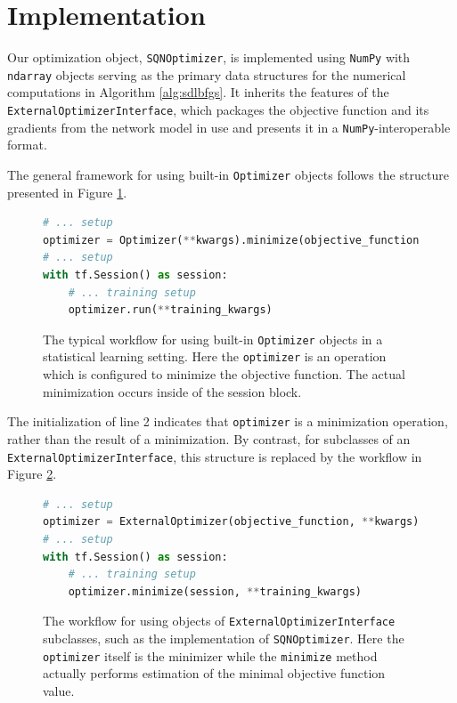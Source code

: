\documentclass{article}
\begin{document}
\section{Implementation}



Our optimization object, \texttt{SQNOptimizer}, is implemented using
\texttt{NumPy} \cite{numpy} with \texttt{ndarray} objects serving as the primary
data structures for the numerical computations in Algorithm \ref{alg:sdlbfgs}.
It inherits the features of the \texttt{ExternalOptimizerInterface}, which
packages the objective function and its gradients from the network model in use
and presents it in a \texttt{NumPy}-interoperable format. 

The general framework for using built-in \texttt{Optimizer} objects follows the
structure presented in Figure \ref{fig:typical}.
\begin{figure}[h]
  \begin{lstlisting}[language=Python]
# ... setup
optimizer = Optimizer(**kwargs).minimize(objective_function)
# ... setup
with tf.Session() as session:
    # ... training setup
    optimizer.run(**training_kwargs)
  \end{lstlisting}
  \caption{The typical workflow for using built-in \texttt{Optimizer} objects in
    a statistical learning setting. Here the \texttt{optimizer} is an operation
    which is configured to minimize the objective function. The actual
  minimization occurs inside of the session block.}
  \label{fig:typical}
\end{figure}
The initialization of line 2 indicates that \texttt{optimizer} is a minimization
operation, rather than the result of a minimization. By contrast, for subclasses
of an \texttt{ExternalOptimizerInterface}, this structure is replaced by the
workflow in Figure \ref{fig:external}.
\begin{figure}[h]
  \begin{lstlisting}[language=Python]
# ... setup
optimizer = ExternalOptimizer(objective_function, **kwargs)
# ... setup
with tf.Session() as session:
    # ... training setup
    optimizer.minimize(session, **training_kwargs)
  \end{lstlisting}
  \caption{%
    The workflow for using objects of 
  \texttt{ExternalOptimizerInterface} subclasses, such as the implementation of
  \texttt{SQNOptimizer}. Here the \texttt{optimizer} itself is the minimizer while
  the \texttt{minimize} method actually performs estimation of the minimal
  objective function value.  }
  \label{fig:external}
\end{figure}
\end{document}
